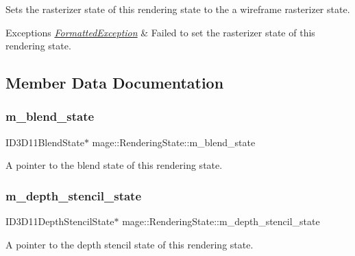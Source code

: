 Sets the rasterizer state of this rendering state to the a wireframe rasterizer state.


\begin{DoxyExceptions}{Exceptions}
{\em \hyperlink{structmage_1_1_formatted_exception}{Formatted\+Exception}} & Failed to set the rasterizer state of this rendering state. \\
\hline
\end{DoxyExceptions}


\subsection{Member Data Documentation}
\hypertarget{structmage_1_1_rendering_state_ab08e5f63a1bd463ce6029eaaf3526ae4}{}\label{structmage_1_1_rendering_state_ab08e5f63a1bd463ce6029eaaf3526ae4} 
\subsubsection{\texorpdfstring{m\+\_\+blend\+\_\+state}{m\_blend\_state}}
{\footnotesize\ttfamily I\+D3\+D11\+Blend\+State$\ast$ mage\+::\+Rendering\+State\+::m\+\_\+blend\+\_\+state\hspace{0.3cm}{\ttfamily [private]}}

A pointer to the blend state of this rendering state. \hypertarget{structmage_1_1_rendering_state_a2428412ad160c0d4dd2538c3a9cc863f}{}\label{structmage_1_1_rendering_state_a2428412ad160c0d4dd2538c3a9cc863f} 
\subsubsection{\texorpdfstring{m\+\_\+depth\+\_\+stencil\+\_\+state}{m\_depth\_stencil\_state}}
{\footnotesize\ttfamily I\+D3\+D11\+Depth\+Stencil\+State$\ast$ mage\+::\+Rendering\+State\+::m\+\_\+depth\+\_\+stencil\+\_\+state\hspace{0.3cm}{\ttfamily [private]}}

A pointer to the depth stencil state of this rendering state. \hypertarget{structmage_1_1_rendering_state_a7985712bda141bfac079d4fb6d85cfec}{}\label{structmage_1_1_rendering_state_a7985712bda141bfac079d4fb6d85cfec} 
